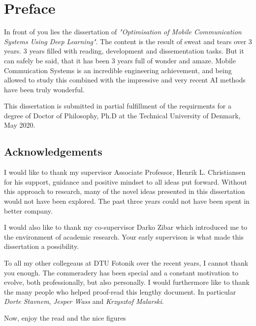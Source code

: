 \chapter*{Preface}
In front of you lies the dissertation of \emph{"Optimisation of Mobile Communication Systems Using Deep Learning"}. The content is the result of sweat and tears over 3 years. 3 years filled with reading, development and dissementation tasks. But it can safely be said, that it has been 3 years full of wonder and amaze. Mobile Commuication Systems is an incredible engineering achievement, and being allowed to study this combined with the impressive and very recent AI methods have been truly wonderful. 

This dissertation is submitted in partial fulfillment of the requirments for a degree of Doctor of Philosophy, Ph.D at the Technical University of Denmark, May 2020.


\section*{Acknowledgements}

I would like to thank my supervisor Associate Professor, Henrik L. Christiansen for his support, guidance and positive mindset to all ideas put forward. Without this approach to research, many of the novel ideas presented in this dissertation would not have been explored. The past three years could not have been spent in better company.

I would also like to thank my co-supervisor Darko Zibar which introduced me to the environment of academic research. Your early supervison is what made this dissertation a possibility.

To all my other collegeaus at DTU Fotonik over the recent years, I cannot thank you enough. The commeradery has been special and a constant motivation to evolve, both professionally, but also personally.
I would furthermore like to thank the many people who helped proof-read this lengthy document. In particular \emph{Dorte Stavnem}, \emph{Jesper Wass} and \emph{Krzysztof Malarski}.

Now, enjoy the read and the nice figures

\vspace{4em}



